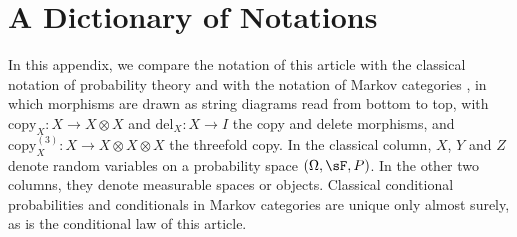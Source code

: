 \documentclass[12pt,reqno]{amsart}%
\theoremstyle{plain}
\theoremstyle{definition}
\begin{document}
%
%
%
\section{A Dictionary of Notations}\label{sec: appendix C}
%
%
%

In this appendix, we compare the notation of this article with the classical notation of probability theory
and with the notation of Markov categories \cite{F20}, in which morphisms are drawn as string diagrams
read from bottom to top, with $\mathrm{copy}_X\colon X\rightarrow X\otimes X$ and $\mathrm{del}_X\colon X\rightarrow I$
the copy and delete morphisms, and $\mathrm{copy}^{(3)}_X\colon X\rightarrow X\otimes X\otimes X$ the threefold copy.
In the classical column, $X$, $Y$ and $Z$ denote random variables on a probability space $(\Omega,\sF,P)$.
In the other two columns, they denote measurable spaces or objects.
Classical conditional probabilities and conditionals in Markov categories are unique only almost surely,
as is the conditional law of this article.
\end{document}
